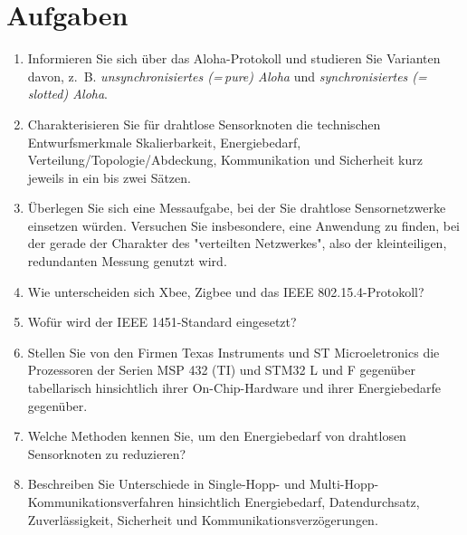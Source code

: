 \section{Aufgaben}
\begin{enumerate}
\item Informieren Sie sich über das Aloha-Protokoll und studieren Sie Varianten davon, z.~B. \emph{unsynchronisiertes (=\,pure) Aloha} und \emph{synchronisiertes (=\,slotted) Aloha}. 
\parencite{Roberts1975}
\item Charakterisieren Sie für drahtlose Sensorknoten die technischen Entwurfsmerkmale Skalierbarkeit, Energiebedarf, Verteilung/Topologie/Abdeckung, Kommunikation und Sicherheit kurz jeweils in ein bis zwei Sätzen.
\item Überlegen Sie sich eine Messaufgabe, bei der Sie drahtlose Sensornetzwerke einsetzen würden. Versuchen Sie insbesondere, eine Anwendung zu finden, bei der gerade der Charakter des "verteilten Netzwerkes", also der kleinteiligen, redundanten Messung genutzt wird.
\item Wie unterscheiden sich Xbee, Zigbee und das IEEE 802.15.4-Protokoll?
\item Wofür wird der IEEE 1451-Standard eingesetzt?
\item Stellen Sie von den Firmen Texas Instruments und ST Microeletronics die Prozessoren der Serien MSP 432 (TI) und STM32 L und F gegenüber tabellarisch hinsichtlich ihrer On-Chip-Hardware und ihrer Energiebedarfe gegenüber.
\item Welche Methoden kennen Sie, um den Energiebedarf von drahtlosen Sensorknoten zu reduzieren?
\item Beschreiben Sie Unterschiede in Single-Hopp- und Multi-Hopp-Kommunikationsverfahren hinsichtlich Energiebedarf, Datendurchsatz, Zuverlässigkeit, Sicherheit und Kommunikationsverzögerungen.
\end{enumerate}

 